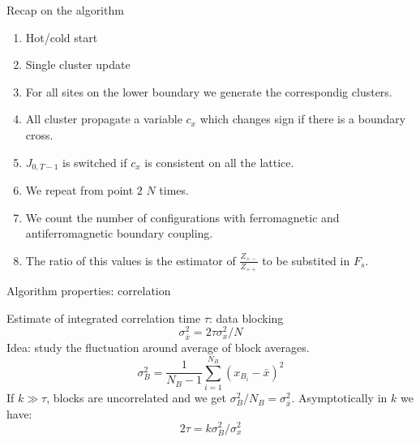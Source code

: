 \documentclass[12pt,handout]{beamer}
\begin{document}
\begin{frame}{Recap on the algorithm}
\begin{center}

\begin{enumerate}
\item Hot/cold start
\item Single cluster update
\item For all sites on the lower boundary we generate the correspondig clusters.
\item All cluster propagate a variable $c_x$ which changes sign if there is a boundary cross.
\item  $J_{0, T-1}$ is switched if $c_x$ is consistent on all the lattice.
\item We repeat from point $2$ $N$ times.
\item We count the number of configurations with ferromagnetic and antiferromagnetic boundary coupling.
\item The ratio of this values is the estimator of $\frac{Z_{+-}}{Z_{++}}$ to be substited in $F_s$.
\end{enumerate}


\end{center}
\end{frame}


\begin{frame}{Algorithm properties: correlation}
\begin{center}
Estimate of integrated correlation time $\tau$: data blocking
\[
\sigma_{\bar{x}}^2 = 2\tau\sigma_{x}^2/N
\]
Idea: study the fluctuation around average of block averages.
\[
\sigma _B ^2 = \frac{1}{N_B - 1}\sum_ {i = 1} ^{N_B} \left( x_{B_i} - \bar{x} \right)^2 
\]
If $k\gg\tau$, blocks are uncorrelated and we get $\sigma_B^2/N_B = \sigma_{\bar{x}}^2$.
Asymptotically in $k$ we have:
\[
2\tau = k \sigma_B ^2/\sigma_{x}^2
\]
\end{center}
\end{frame}
\end{document}
